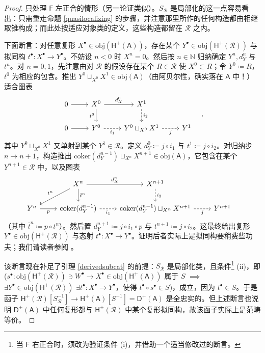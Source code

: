 \begin{proof}
	只处理 $\mathsf{F}$ 左正合的情形（另一论证类似）。$S_\mathcal{R}$ 是局部化的这一点容易看出：只需重走命题 \ref{quasilocalizing} 的步骤，并注意那里所作的任何构造都由相继取锥构成；而此处按适应对象类的定义，这些构造都留在 $\mathcal{R}$ 之内。
	
	下面断言：对任意复形 $X^\bullet\in\text{obj}(\mathsf{H^+(A)})$，存在某个 $Y^\bullet\in\text{obj}(\mathsf{H^+(\mathcal{R})})$ 与拟同构 $t^\bullet:X^\bullet\rightarrow Y^\bullet$。不妨设 $n<0$ 时 $X^n=0$。然后按 $n\in\mathbb{N}$ 归纳确定 $Y^n, d_Y^n$ 与 $t^n$。对 $n=0,1$，先注意由对 $\mathcal{R}$ 的假设存在某个 $R\in\mathcal{R}$ 使 $X^0\subset R$；令 $Y^0\coloneqq R$，$t^0$ 为相应的包含。推出 $Y^0\sqcup_{X^0} X^1\in\text{obj}(\mathsf{A})$（由阿贝尔性，确实落在 $\mathsf{A}$ 中！）适合图表
	\[
	\begin{tikzcd}
		0\arrow[r] & X^0\arrow[r, "d_X^0"]\arrow[d, "t^0"'] & X^1\arrow[d, dashed, "i_2"] & \\
		0\arrow[r] & Y^0\arrow[r, dashed,"i_1"'] & Y^0\sqcup_{X^0} X^1\arrow[r, dashed, "j"'] & Y^1
	\end{tikzcd}\quad,
	\]
	其中 $Y^0\sqcup_{X^0} X^1$ 又单射到某个 $Y^1\in\mathcal{R}$。定义 $d_Y^0\coloneqq j\circ i_1$ 与 $t^1\coloneqq j\circ i_2$。对归纳步 $n\rightarrow n+1$，构造推出 $\text{coker}(d_Y^{n-1})\sqcup_{X^n} X^{n+1}\in\text{obj}(\mathsf{A})$，它包含在某个 $Y^{n+1}\in\mathcal{R}$ 中，以及图表
	\[
	\begin{tikzcd}
		& X^n\arrow[r, "d_X^n"]\arrow[d, "\bar{t}^n"]\arrow[dl, "t^n"'] & X^{n+1}\arrow[d, dashed, "i_2"] & \\
		Y^n\arrow[r, "p"'] & \text{coker}(d_Y^{n-1})\arrow[r, dashed,"i_1"'] & \text{coker}(d_Y^{n-1})\sqcup_{X^n} X^{n+1}\arrow[r, dashed, "j"'] & Y^{n+1}
	\end{tikzcd}\quad
	\]
	（其中 $\bar{t}^n\coloneqq p\circ t^n$）。然后置 $d_Y^{n+1}\coloneqq j\circ i_1\circ p$ 与 $t^{n+1}\coloneqq j\circ i_2$。这最终给出复形 $Y^\bullet\in\text{obj}(\mathsf{H^+(\mathcal{R})})$ 与态射 $t^\bullet:X^\bullet\rightarrow Y^\bullet$。证明后者实际上是拟同构要稍费些功夫；我们请读者参阅 \cite[subsection III.5.25]{[GM03]}。
	
	该断言现在补足了引理 \ref{derivedsubcat} 的前提：$S_\mathcal{R}$ 是局部化类，且条件\footnote{当 $\mathsf{F}$ 右正合时，须改为验证条件 (i)，并借助一个适当修改过的断言。} (ii)，即 \big($s^\bullet:\text{obj}(\mathsf{H^+(\mathcal{R})})\ni W^\bullet\rightarrow X^\bullet\in\text{obj}(\mathsf{H^+(A)})$ 属于 $S$ $\implies$ $\exists Y^\bullet\in\text{obj}(\mathsf{H^+(\mathcal{R})})$ $\exists t^\bullet:X^\bullet\rightarrow Y^\bullet$，使得 $t^\bullet\circ s^\bullet\in S$\big)，成立，因为 $t^\bullet\in S$。于是函子 $\mathsf{H^+(\mathcal{R})}[S_\mathcal{R}^{-1}]\rightarrow\mathsf{H^+(A)}[S^{-1}]=\mathsf{D^+(A)}$ 是全忠实的。但上述断言也说明 $\mathsf{D^+(A)}$ 中任何复形都与 $\mathsf{H^+(\mathcal{R})}$ 中某个复形拟同构，故该函子实际上是范畴等价。
\end{proof}


